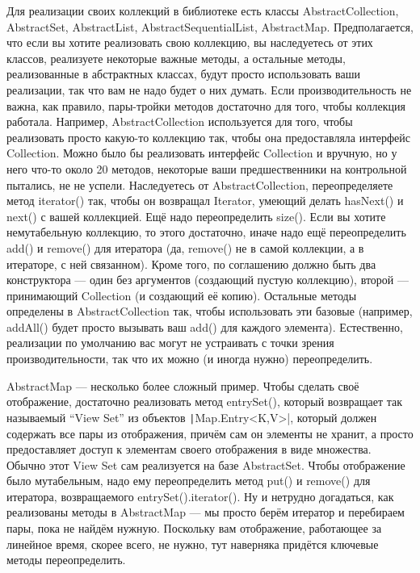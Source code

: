\documentclass[a5paper]{article}
\begin{document}
Для реализации своих коллекций в библиотеке есть классы AbstractCollection, AbstractSet, AbstractList, AbstractSequentialList, AbstractMap. Предполагается, что если вы хотите реализовать свою коллекцию, вы наследуетесь от этих классов, реализуете некоторые важные методы, а остальные методы, реализованные в абстрактных классах, будут просто использовать ваши реализации, так что вам не надо будет о них думать. Если производительность не важна, как правило, пары-тройки методов достаточно для того, чтобы коллекция работала. Например, AbstractCollection используется для того, чтобы реализовать просто какую-то коллекцию так, чтобы она предоставляла интерфейс Collection. Можно было бы реализовать интерфейс Collection и вручную, но у него что-то около 20 методов, некоторые ваши предшественники на контрольной пытались, не не успели. Наследуетесь от AbstractCollection, переопределяете метод iterator() так, чтобы он возвращал Iterator, умеющий делать hasNext() и next() с вашей коллекцией. Ещё надо переопределить size(). Если вы хотите немутабельную коллекцию, то этого достаточно, иначе надо ещё переопределить add() и remove() для итератора (да, remove() не в самой коллекции, а в итераторе, с ней связанном). Кроме того, по соглашению должно быть два конструктора --- один без аргументов (создающий пустую коллекцию), второй --- принимающий Collection (и создающий её копию). Остальные методы определены в AbstractCollection так, чтобы использовать эти базовые (например, addAll() будет просто вызывать ваш add() для каждого элемента). Естественно, реализации по умолчанию вас могут не устраивать с точки зрения производительности, так что их можно (и иногда нужно) переопределить.

AbstractMap --- несколько более сложный пример. Чтобы сделать своё отображение, достаточно реализовать метод entrySet(), который возвращает так называемый ``View Set'' из объектов \texttt|Map.Entry<K,V>|, который должен содержать все пары из отображения, причём сам он элементы не хранит, а просто предоставляет доступ к элементам своего отображения в виде множества. Обычно этот View Set сам реализуется на базе AbstractSet. Чтобы отображение было мутабельным, надо ему переопределить метод put() и remove() для итератора, возвращаемого entrySet().iterator(). Ну и нетрудно догадаться, как реализованы методы в AbstractMap --- мы просто берём итератор и перебираем пары, пока не найдём нужную. Поскольку вам отображение, работающее за линейное время, скорее всего, не нужно, тут наверняка придётся ключевые методы переопределить.
\end{document}
